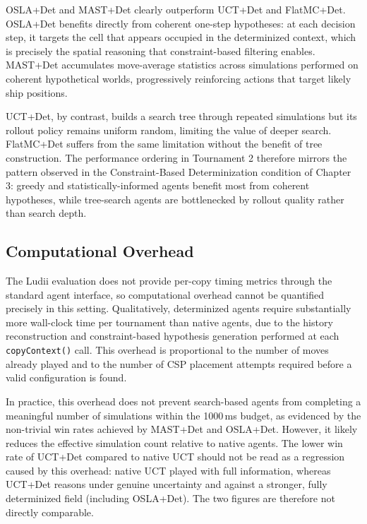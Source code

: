 OSLA+Det and MAST+Det clearly outperform UCT+Det and FlatMC+Det. 
OSLA+Det benefits directly from coherent one-step hypotheses: at each 
decision step, it targets the cell that appears occupied in the 
determinized context, which is precisely the spatial reasoning that 
constraint-based filtering enables. MAST+Det accumulates move-average 
statistics across simulations performed on coherent hypothetical worlds, 
progressively reinforcing actions that target likely ship positions.

UCT+Det, by contrast, builds a search tree through repeated 
simulations but its rollout policy remains uniform random, limiting 
the value of deeper search. FlatMC+Det suffers from the same 
limitation without the benefit of tree construction. The performance 
ordering in Tournament 2 therefore mirrors the pattern observed in 
the Constraint-Based Determinization condition of Chapter 3: greedy 
and statistically-informed agents benefit most from coherent 
hypotheses, while tree-search agents are bottlenecked by rollout 
quality rather than search depth.

\subsection{Computational Overhead}

The Ludii evaluation does not provide per-copy timing metrics through 
the standard agent interface, so computational overhead cannot be 
quantified precisely in this setting. Qualitatively, determinized 
agents require substantially more wall-clock time per tournament than 
native agents, due to the history reconstruction and constraint-based 
hypothesis generation performed at each \texttt{copyContext()} call. 
This overhead is proportional to the number of moves already played 
and to the number of CSP placement attempts required before a valid 
configuration is found.

In practice, this overhead does not prevent search-based agents from 
completing a meaningful number of simulations within the 1000\,ms 
budget, as evidenced by the non-trivial win rates achieved by 
MAST+Det and OSLA+Det. However, it likely reduces the effective simulation count relative to native agents. The lower win rate of UCT+Det compared to native UCT should not be read as a regression caused by this overhead: native UCT played with full information, whereas UCT+Det reasons under genuine uncertainty and against a stronger, fully determinized field (including OSLA+Det). The two figures are therefore not directly comparable. 


